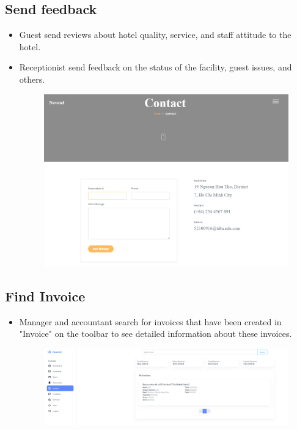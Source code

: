     \subsection{Send feedback}
    \begin{itemize}
        \item Guest send reviews about hotel quality, service, and staff attitude to the hotel.
        \item Receptionist send feedback on the status of the facility, guest issues, and others.
        \begin{figure}[H]
            \includegraphics[width=1\linewidth]{img/sendfeed.png}
            \label{fig:sendfeedback}
        \end{figure}
    \end{itemize}
    \subsection{Find Invoice}
    \begin{itemize}
        \item Manager and accountant search for invoices that have been created in "Invoice" on the toolbar to see detailed information about these invoices.
        \begin{figure}[H]
            \includegraphics[width=1\linewidth]{img/findinvoice.png}
            \label{fig:findinvoice}
        \end{figure}
    \end{itemize}
